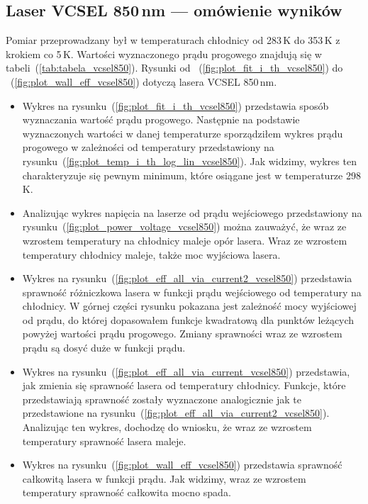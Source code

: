 \newpage
\subsection{Laser VCSEL 850\,nm --- omówienie wyników}
Pomiar przeprowadzany był w temperaturach chłodnicy od 283\,K do 353\,K z krokiem co 5\,K. Wartości wyznaczonego prądu progowego
znajdują się w tabeli~(\ref{tab:tabela_vcsel850}). Rysunki od ~(\ref{fig:plot_fit_i_th_vcsel850}) do ~(\ref{fig:plot_wall_eff_vcsel850}) dotyczą lasera
VCSEL 850\,nm.
\begin{itemize}
\item Wykres na rysunku~(\ref{fig:plot_fit_i_th_vcsel850}) przedstawia sposób wyznaczania wartość prądu progowego. Następnie na podstawie
wyznaczonych wartości w danej temperaturze sporządziłem wykres prądu progowego w zależności od temperatury
przedstawiony na rysunku~(\ref{fig:plot_temp_i_th_log_lin_vcsel850}). Jak widzimy, wykres ten charakteryzuje się pewnym minimum, które
osiągane jest w temperaturze 298\,K.
\item Analizując wykres napięcia na laserze od prądu wejściowego przedstawiony na rysunku~(\ref{fig:plot_power_voltage_vcsel850})
można zauważyć, że wraz ze wzrostem temperatury na chłodnicy
maleje opór lasera. Wraz ze wzrostem temperatury chłodnicy maleje, także moc wyjściowa lasera.
\item Wykres na rysunku~(\ref{fig:plot_eff_all_via_current2_vcsel850}) przedstawia sprawność różniczkowa lasera w funkcji prądu wejściowego
od temperatury na chłodnicy. W górnej części rysunku pokazana jest zależność mocy wyjściowej od prądu, do której dopasowałem
funkcje kwadratową dla punktów leżących powyżej wartości prądu progowego.
Zmiany sprawności wraz ze wzrostem prądu są dosyć duże w funkcji prądu.
\item Wykres na rysunku~(\ref{fig:plot_eff_all_via_current_vcsel850}) przedstawia, jak zmienia się sprawność lasera od temperatury chłodnicy.
Funkcje, które przedstawiają sprawność zostały wyznaczone analogicznie jak te przedstawione na rysunku~(\ref{fig:plot_eff_all_via_current2_vcsel850}).
Analizując ten wykres, dochodzę do wniosku, że wraz ze wzrostem temperatury sprawność lasera maleje.
\item Wykres na rysunku~(\ref{fig:plot_wall_eff_vcsel850}) przedstawia sprawność całkowitą lasera w funkcji prądu. Jak widzimy,
wraz ze wzrostem temperatury sprawność całkowita mocno spada.
\end{itemize}
